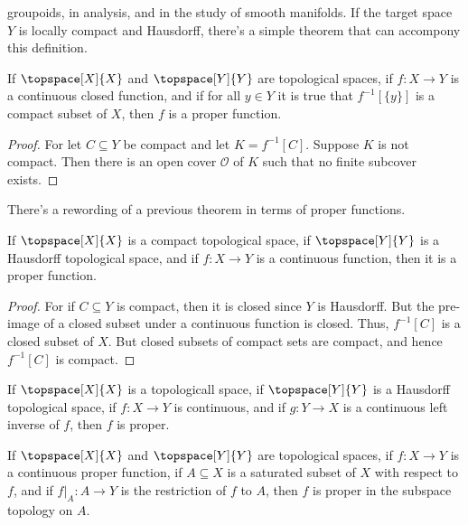 \documentclass{article}                                                        %
\begin{document}
        groupoids, in analysis, and in the study of smooth manifolds. If the
        target space $Y$ is locally compact and Hausdorff, there's a simple
        theorem that can accompony this definition.
        \begin{theorem}
            If $\topspace[X]{X}$ and $\topspace[Y]{Y}$ are topological spaces,
            if $f:X\rightarrow{Y}$ is a continuous closed function, and if for
            all $y\in{Y}$ it is true that $f^{\minus{1}}[\{y\}]$ is a compact
            subset of $X$, then $f$ is a proper function.
        \end{theorem}
        \begin{proof}
            For let $C\subseteq{Y}$ be compact and let $K=f^{\minus{1}}[C]$.
            Suppose $K$ is not compact. Then there is an open cover
            $\mathcal{O}$ of $K$ such that no finite subcover exists.
        \end{proof}
        There's a rewording of a previous theorem in terms of proper functions.
        \begin{theorem}
            If $\topspace[X]{X}$ is a compact topological space, if
            $\topspace[Y]{Y}$ is a Hausdorff topological space, and if
            $f:X\rightarrow{Y}$ is a continuous function, then it is a proper
            function.
        \end{theorem}
        \begin{proof}
            For if $C\subseteq{Y}$ is compact, then it is closed since $Y$ is
            Hausdorff. But the pre-image of a closed subset under a continuous
            function is closed. Thus, $f^{\minus{1}}[C]$ is a closed subset of
            $X$. But closed subsets of compact sets are compact, and hence
            $f^{\minus{1}}[C]$ is compact.
        \end{proof}
        \begin{theorem}
            If $\topspace[X]{X}$ is a topologicall space, if $\topspace[Y]{Y}$
            is a Hausdorff topological space, if $f:X\rightarrow{Y}$ is
            continuous, and if $g:Y\rightarrow{X}$ is a continuous left inverse
            of $f$, then $f$ is proper.
        \end{theorem}
        \begin{theorem}
            If $\topspace[X]{X}$ and $\topspace[Y]{Y}$ are topological spaces,
            if $f:X\rightarrow{Y}$ is a continuous proper function, if
            $A\subseteq{X}$ is a saturated subset of $X$ with respect to $f$,
            and if $f|_{A}:A\rightarrow{Y}$ is the restriction of $f$ to $A$,
            then $f$ is proper in the subspace topology on $A$.
        \end{theorem}
\end{document}
